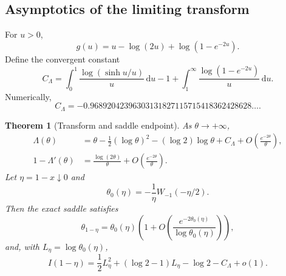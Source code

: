 \documentclass[11pt,a4paper]{article}
\newtheorem{theorem}{Theorem}[section]
\theoremstyle{definition}
\newcommand{\dd}{\,\mathrm{d}}
\newcommand{\cL}{C_{\Lambda}}
\newcommand{\1}{\mathbf{1}}
\begin{document}
\subsection{Asymptotics of the limiting transform}

For $u>0$,
\begin{equation}
 g(u)=u-\log(2u)+\log(1-e^{-2u}).
 \label{eq:g-large}
\end{equation}
Define the convergent constant
\begin{equation}
 \cL=
 \int_0^1\frac{\log(\sinh u/u)}{u}\dd u-1
 +\int_1^\infty\frac{\log(1-e^{-2u})}{u}\dd u.
 \label{eq:CLambda}
\end{equation}
Numerically,
\begin{equation}
 \cL=-0.96892042396303131827115715418362428628\ldots.
 \label{eq:CLambda-value}
\end{equation}

\begin{theorem}[Transform and saddle endpoint]
\label{thm:Lambert-edge}
As $\theta\to+\infty$,
\begin{align}
 \Lambda(\theta)
 &=\theta-\frac12(\log\theta)^2
   -(\log2)\log\theta+\cL
   +O\!\left(\frac{e^{-2\theta}}{\theta}\right),
 \label{eq:Lambda-large}\\
 1-\Lambda'(\theta)
 &=\frac{\log(2\theta)}{\theta}
   +O\!\left(\frac{e^{-2\theta}}{\theta}\right).
 \label{eq:Lambda-prime-large}
\end{align}
Let $\eta=1-x\downarrow0$ and
\begin{equation}
 \theta_0(\eta)=-\frac1\eta W_{-1}(-\eta/2).
 \label{eq:theta-Lambert}
\end{equation}
Then the exact saddle satisfies
\begin{equation}
 \theta_{1-\eta}=\theta_0(\eta)
 \left(1+O\!\left(\frac{e^{-2\theta_0(\eta)}}{\log\theta_0(\eta)}\right)\right),
 \label{eq:theta-Lambert-error}
\end{equation}
and, with $L_\eta=\log\theta_0(\eta)$,
\begin{equation}
 I(1-\eta)
 =\frac12L_\eta^2+(\log2-1)L_\eta
   -\log2-\cL+o(1).
 \label{eq:I-Lambert}
\end{equation}
\end{theorem}
\end{document}
